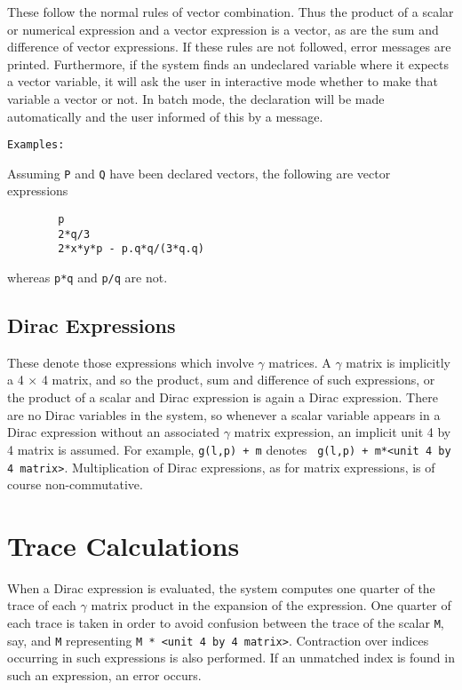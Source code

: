 These follow the normal rules of vector combination. Thus the product of a
scalar or numerical expression and a vector expression is a vector, as are
the sum and difference of vector expressions. If these rules are not
followed, error messages are printed. Furthermore, if the system finds an
undeclared variable where it expects a vector variable, it will ask the
user in interactive mode whether to make that variable a vector or not. In
batch mode, the declaration will be made automatically and the user
informed of this by a message.

{\tt Examples:}

Assuming {\tt P} and {\tt Q} have been declared vectors, the following are
vector expressions
\begin{verbatim}
        p
        2*q/3
        2*x*y*p - p.q*q/(3*q.q)
\end{verbatim}
whereas {\tt p*q} and {\tt p/q} are not.

\subsection{Dirac Expressions}

These denote those expressions which involve $\gamma$ matrices. A $\gamma$
matrix is implicitly a 4 $\times$ 4 matrix, and so the product, sum and
difference of such expressions, or the product of a scalar and Dirac
expression is again a Dirac expression.  There are no Dirac variables in
the system, so whenever a scalar variable appears in a Dirac expression
without an associated $\gamma$ matrix expression, an implicit unit 4
by 4 matrix is assumed.  For example, {\tt g(l,p) + m} denotes {\tt
g(l,p) + m*<unit 4 by 4 matrix>}.  Multiplication of Dirac
expressions, as for matrix expressions, is of course non-commutative.

\section{Trace Calculations}

When a Dirac expression is evaluated, the system computes one quarter of
the trace of each $\gamma$ matrix product in the expansion of the expression.
One quarter of each trace is taken in order to avoid confusion between the
trace of the scalar {\tt M}, say, and {\tt M} representing {\tt M * <unit
4 by 4 matrix>}.  Contraction over indices occurring in such expressions is
also performed.  If an unmatched index is found in such an expression, an
error occurs.

